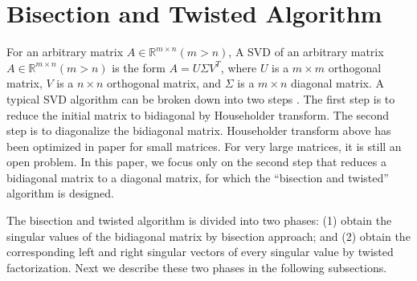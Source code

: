 \vspace{-0.1in}
\section{Bisection and Twisted Algorithm} \label{sec:algorithm}
\vspace{-0.1in}
For an arbitrary matrix $A\in \mathbb{R}^{m \times n} (m>n)$, 
A SVD of an arbitrary matrix $A\in \mathbb{R}^{m \times n} (m>n)$ is the form $A = U \Sigma V^T$, where $U$ is a $m \times m$ orthogonal matrix, $V$ is a $n\times n$ orthogonal matrix, and $\Sigma$ is a $m\times n$ diagonal matrix.
A typical SVD algorithm can be broken down into two steps \cite{65SIAM}.
The first step is to reduce the initial matrix to bidiagonal by Householder transform.
The second step is to diagonalize the bidiagonal matrix.
Householder transform above has been optimized in paper \cite{LiuHouseholder} for small matrices. For very large matrices, it is still an open problem. 
In this paper, we focus only on the second step that reduces a bidiagonal matrix to a diagonal matrix, for which the  ``bisection and twisted'' algorithm is designed.

 
The bisection and twisted algorithm is divided into two phases:
(1) obtain the singular values of the bidiagonal matrix by bisection approach; and
(2) obtain the corresponding left and right singular vectors of every singular value by twisted factorization.
Next we describe these two phases in the following subsections.

\vspace{-0.15in}
